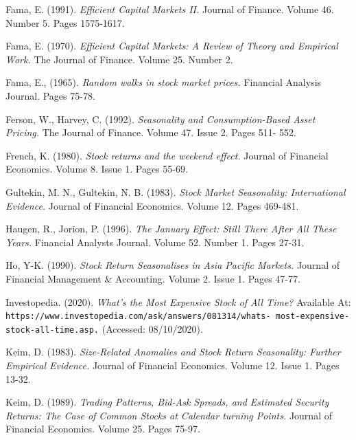 \documentclass[11pt, english]{article}
\begin{document}
\begin{thebibliography}{9}

		Fama, E. (1991).
		\textsl{Efficient Capital Markets II.}
		Journal of Finance. Volume 46. Number 5. Pages 1575-1617.

		Fama, E. (1970).
		\textsl{Efficient Capital Markets: A Review of Theory and Empirical Work.}
		The Journal of Finance. Volume 25. Number 2.

		Fama, E., (1965).
		\textsl{Random walks in stock market prices.}
		Financial Analysis Journal. Pages 75-78.

		Ferson, W., Harvey, C. (1992).
		\textsl{Seasonality and Consumption-Based Asset Pricing.}
		The Journal of Finance. Volume 47. Issue 2. Pages 511- 552.

		French, K. (1980).
		\textsl{Stock returns and the weekend effect.}
		Journal of Financial Economics. Volume 8. Issue 1. Pages 55-69.


		Gultekin, M. N., Gultekin, N. B. (1983).
		\textsl{Stock Market Seasonality: International Evidence.}
		Journal of Financial Economics. Volume 12. Pages 469-481.


		Haugen, R., Jorion, P. (1996).
		\textsl{The January Effect: Still There After All These Years.}
		Financial Analysts Journal. Volume 52. Number 1. Pages 27-31.

		Ho, Y-K. (1990).
		\textsl{Stock Return Seasonalises in Asia Pacific Markets.}
		Journal of Financial Management \& Accounting. Volume 2. Issue 1. Pages 47-77.


		Investopedia. (2020).
		\textsl{What’s the Most Expensive Stock of All Time?}
		Available At:
		\texttt{https://www.investopedia.com/ask/answers/081314/whats- most-expensive-stock-all-time.asp.}
		(Accessed: 08/10/2020).


		Keim, D. (1983).
		\textsl{Size-Related Anomalies and Stock Return Seasonality: Further Empirical Evidence.}
		Journal of Financial Economics. Volume 12. Issue 1. Pages 13-32.


		Keim, D. (1989).
		\textsl{Trading Patterns, Bid-Ask Spreads, and Estimated Security Returns: The Case of Common Stocks at Calendar turning Points.}
		Journal of Financial Economics. Volume 25. Pages 75-97.


\end{thebibliography}
\end{document}
